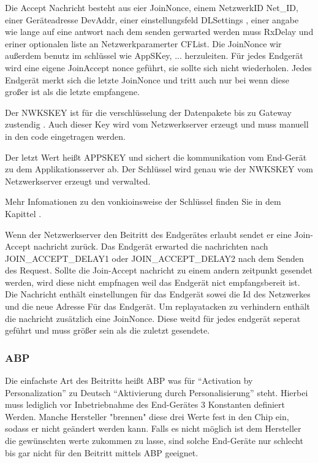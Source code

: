 \documentclass[a4paper,12pt]{article}
\begin{document}
            Die Accept Nachricht besteht aus eier JoinNonce, einem NetzwerkID Net\_ID, einer Geräteadresse DevAddr, einer einstellungsfeld DLSettings , einer angabe wie lange auf eine antwort nach dem senden gerwarted werden muss RxDelay und eriner optionalen liste an Netzwerkparamerter CFList. Die JoinNonce wir außerdem benutz im schlüssel wie AppSKey, ... herzuleiten.
            Für jedes Endgerät wird eine eigene JoinAccept nonce geführt, sie sollte sich nicht wiederholen. Jedes Endgerät merkt sich die letzte JoinNonce und tritt auch nur bei wenn diese großer ist als die letzte empfangene.

            Der NWKSKEY ist für die verschlüsselung der Datenpakete bis zu Gateway zustendig . Auch dieser Key wird vom Netzwerkserver erzeugt und muss manuell in den code eingetragen werden.
        
            Der letzt Wert heißt APPSKEY und sichert die kommunikation vom End-Gerät zu dem Applikationsserver ab. Der Schlüssel wird genau wie der NWKSKEY vom Netzwerkserver erzeugt und verwalted.
        
            Mehr Infomationen zu den vonkioinsweise der Schlüssel finden Sie in dem Kapittel .


            Wenn der Netzwerkserver den Beitritt des Endgerätes erlaubt sendet er eine Join-Accept nachricht zurück. Das Endgerät erwarted die nachrichten nach JOIN\_ACCEPT\_DELAY1 oder JOIN\_ACCEPT\_DELAY2 nach dem Senden des Request. Sollte die Join-Accept nachricht zu einem andern zeitpunkt gesendet werden, wird diese nicht empfnagen weil das Endgerät nict empfangsbereit ist.
            Die Nachricht enthält einstellungen für das Endgerät sowei die Id des Netzwerkes und die neue Adresse Für das Endgerät. Um replayatacken zu verhindern enthält die nachricht zusätzlich eine JoinNonce. Diese weitd für jedes endgerät seperat geführt und muss größer sein als die zuletzt gesendete.
            

            \subsubsection{ABP}
                Die einfachste Art des Beitritts heißt ABP was für ``Activation by Personalization'' zu Deutsch 
                ``Aktivierung durch Personalisierung'' steht. Hierbei muss lediglich vor Inbetriebnahme des 
                End-Gerätes 3 Konstanten definiert Werden. Manche Hersteller "brennen" diese drei Werte fest in den 
                Chip ein, sodass er nicht geändert werden kann. Falls es nicht möglich ist dem Hersteller die 
                gewünschten werte zukommen zu lasse, sind solche End-Geräte nur schlecht bis gar nicht für den Beitritt 
                mittels ABP geeignet.
\end{document}
